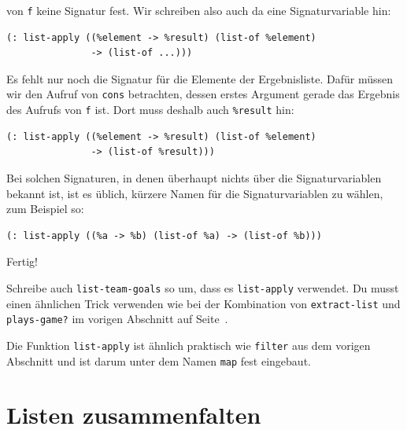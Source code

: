 von  \lstinline{f} keine Signatur fest.  Wir schreiben also auch da
eine Signaturvariable hin:
%
\begin{lstlisting}
(: list-apply ((%element -> %result) (list-of %element)
               -> (list-of ...)))
\end{lstlisting}
%
Es fehlt nur noch die Signatur für die Elemente der Ergebnisliste.
Dafür müssen wir den Aufruf von \lstinline{cons} betrachten, dessen
erstes Argument gerade das Ergebnis des Aufrufs von \lstinline{f}
ist.  Dort muss deshalb auch \lstinline{%result} hin:
%
\begin{lstlisting}
(: list-apply ((%element -> %result) (list-of %element)
               -> (list-of %result)))
\end{lstlisting}
%
Bei solchen Signaturen, in denen überhaupt nichts über die
Signaturvariablen bekannt ist, ist es üblich, kürzere Namen für die
Signaturvariablen zu wählen, zum Beispiel so:
%
\begin{lstlisting}
(: list-apply ((%a -> %b) (list-of %a) -> (list-of %b)))
\end{lstlisting}
%
Fertig!
%
\begin{aufgabeinline}
  Schreibe auch \lstinline{list-team-goals} so um, dass es
  \lstinline{list-apply} verwendet.  Du musst einen ähnlichen Trick
  verwenden wie bei der Kombination von \lstinline{extract-list} und
  \lstinline{plays-game?} im vorigen Abschnitt auf
  Seite~\pageref{code:extract-list-plays-game}.
\end{aufgabeinline}
%
Die Funktion \lstinline{list-apply} ist ähnlich praktisch wie
\lstinline{filter} aus dem vorigen Abschnitt und ist darum unter dem
Namen \lstinline{map} fest eingebaut.\label{func:map}

\section{Listen zusammenfalten}
\label{sec:fold}

